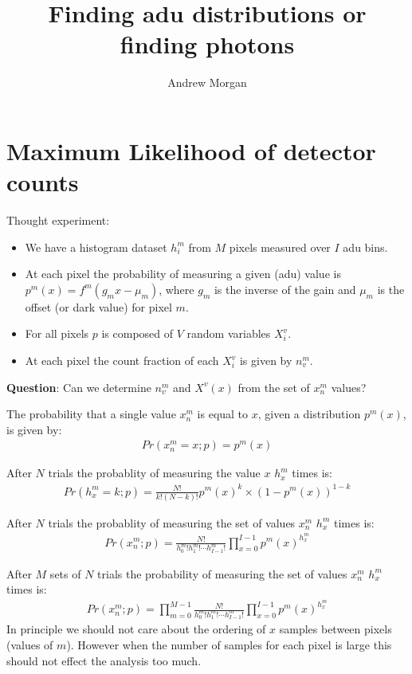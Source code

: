 \documentclass[11pt]{article}
\title{\textbf{Finding adu distributions or finding photons}}
\author{Andrew Morgan}
\date{}
\begin{document}
\maketitle

\section{Maximum Likelihood of detector counts}
Thought experiment:

\begin{itemize}

  \item We have a histogram dataset $h^m_i$ from $M$ pixels measured over $I$ adu bins.
  \item At each pixel the probability of measuring a given (adu) value is $p^m(x) = f^m(g_m x - \mu_m)$, where $g_m$ is the inverse of the gain and $\mu_m$ is the offset (or dark value) for pixel $m$. 
  \item For all pixels $p$ is composed of $V$ random variables $X^v_i$.
  \item At each pixel the count fraction of each $X^v_i$ is given by $n^m_v$.
\end{itemize}

\textbf{Question}: Can we determine $n^m_v$ and $X^v(x)$ from the set of $x^m_n$ values?

The probability that a single value $x^m_n$ is equal to $x$, given a distribution $p^m(x)$, is given by:
\begin{align}
   Pr(x^m_n = x; p) = p^m(x)
\end{align}

After $N$ trials the probablity of measuring the value $x$ $h^m_x$ times is:
\begin{align}
   Pr(h^m_x = k; p) = \frac{N!}{k!(N-k)!} p^m(x)^k \times (1-p^m(x))^{1-k}
\end{align}

After $N$ trials the probablity of measuring the set of values $x^m_n$ $h^m_x$ times is:
\begin{align}
   Pr(x^m_n; p) = \frac{N!}{h^m_0! h^m_1! \cdots h^m_{I-1}!} \prod_{x=0}^{I-1} p^m(x)^{h^m_{x}}
\end{align}


After $M$ sets of $N$ trials the probability of measuring the set of values $x^m_n$ $h^m_x$ times is:
\begin{align}
   Pr(x^m_n; p) = \prod_{m=0}^{M-1}\frac{N!}{h^m_0! h^m_1! \cdots h^m_{I-1}!} \prod_{x=0}^{I-1} p^m(x)^{h^m_{x}}
\end{align}
In principle we should not care about the ordering of $x$ samples between pixels (values of $m$). However when the number of samples for each pixel is large this should not effect the analysis too much. 
\end{document}
